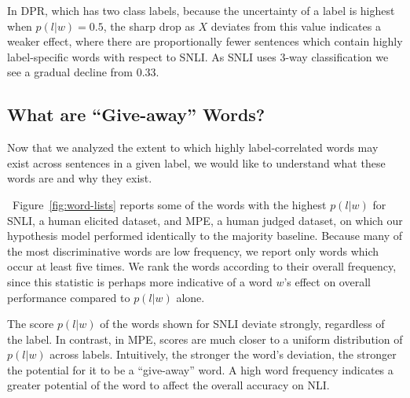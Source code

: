 In DPR, which has two class labels, because the uncertainty of a label is highest when $p(l|w) = 0.5$, the sharp drop as $X$ deviates from this value indicates a weaker effect, where there are proportionally fewer sentences which contain highly label-specific words with respect to SNLI.  As SNLI uses 3-way classification we see a gradual decline from 0.33. 

\subsection{What are ``Give-away'' Words?}

Now that we analyzed the extent to which highly label-correlated words may exist across sentences in a given label, we would like to understand what these words are and why they exist.

~Figure~\ref{fig:word-lists} reports some of the words with the highest $p(l|w)$ for SNLI,  a human elicited dataset, and MPE, a human judged dataset, on which our hypothesis model performed identically to the majority baseline. Because many of the most discriminative words are low frequency, we report only words which occur at least five times. We rank the words according to their overall frequency, since this statistic is perhaps more indicative of a word $w$'s effect on overall performance compared to $p(l|w)$ alone.

The score $p(l|w)$ of the words shown for SNLI deviate strongly, regardless of the label.  In contrast, in MPE, scores are much closer to a uniform distribution of $p(l|w)$ across labels.  Intuitively, the stronger the word's deviation, the stronger the potential for it to be a ``give-away'' word. A high word frequency indicates a greater potential of the word to affect the overall accuracy on NLI.

